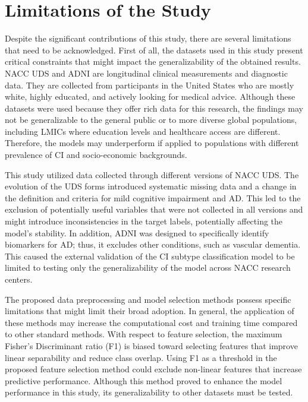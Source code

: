 \section{Limitations of the Study}
Despite the significant contributions of this study, there are several limitations that need to be acknowledged. First of all, the datasets used in this study present critical constraints that might impact the generalizability of the obtained results. NACC UDS and ADNI are longitudinal clinical measurements and diagnostic data. They are collected from participants in the United States who are mostly white, highly educated, and actively looking for medical advice. Although these datasets were used because they offer rich data for this research, the findings may not be generalizable to the general public or to more diverse global populations, including LMICs where education levels and healthcare access are different. Therefore, the models may underperform if applied to populations with different prevalence of CI and socio-economic backgrounds.

This study utilized data collected through different versions of NACC UDS. The evolution of the UDS forms introduced systematic missing data and a change in the definition and criteria for mild cognitive impairment and AD. This led to the exclusion of potentially useful variables that were not collected in all versions and might introduce inconsistencies in the target labels, potentially affecting the model's stability. In addition, ADNI was designed to specifically identify biomarkers for AD; thus, it excludes other conditions, such as vascular dementia. This caused the external validation of the CI subtype classification model to be limited to testing only the generalizability of the model across NACC research centers.

The proposed data preprocessing and model selection methods possess specific limitations that might limit their broad adoption. In general, the application of these methods may increase the computational cost and training time compared to other standard methods. With respect to feature selection, the maximum Fisher's Discriminant ratio (\acrshort{F1}) is biased toward selecting features that improve linear separability and reduce class overlap. Using F1 as a threshold in the proposed feature selection method could exclude non-linear features that increase predictive performance. Although this method proved to enhance the model performance in this study, its generalizability to other datasets must be tested.

